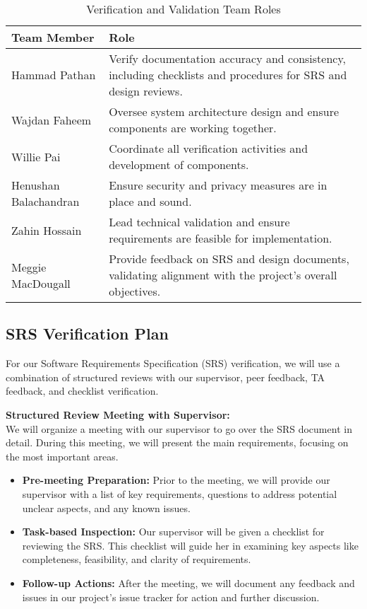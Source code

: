 \documentclass[12pt, titlepage]{article}
\begin{document}
\begin{table}[h!]
\centering
\begin{tabular}{|l|p{10cm}|}
\hline
\textbf{Team Member} & \textbf{Role} \\
\hline
Hammad Pathan & Verify documentation accuracy and consistency, including checklists and procedures for SRS and design reviews. \\
Wajdan Faheem & Oversee system architecture design and ensure components are working together. \\
Willie Pai & Coordinate all verification activities and development of components. \\
Henushan Balachandran & Ensure security and privacy measures are in place and sound. \\
Zahin Hossain & Lead technical validation and ensure requirements are feasible for implementation. \\
Meggie MacDougall & Provide feedback on SRS and design documents, validating alignment with the project’s overall objectives. \\
\hline
\end{tabular}
\caption{Verification and Validation Team Roles}
\end{table}

\subsection{SRS Verification Plan}

For our Software Requirements Specification (SRS) verification, we will use a combination of structured reviews with our supervisor, peer feedback, TA feedback, and checklist verification.

\textbf{Structured Review Meeting with Supervisor:} \\
We will organize a meeting with our supervisor to go over the SRS document in detail. During this meeting, we will present the main requirements, focusing on the most important areas.

\begin{itemize}
    \item \textbf{Pre-meeting Preparation:} Prior to the meeting, we will provide our supervisor with a list of key requirements, questions to address potential unclear aspects, and any known issues.
    \item \textbf{Task-based Inspection:} Our supervisor will be given a checklist for reviewing the SRS. This checklist will guide her in examining key aspects like completeness, feasibility, and clarity of requirements.
    \item \textbf{Follow-up Actions:} After the meeting, we will document any feedback and issues in our project’s issue tracker for action and further discussion.
\end{itemize}
\end{document}
